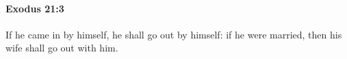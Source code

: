 
		\paragraph{Exodus 21:3} %
			\label{EXODUS-21-3}

			If he came in by himself, he shall go out by himself: if he were married, then his wife shall go out with him.


